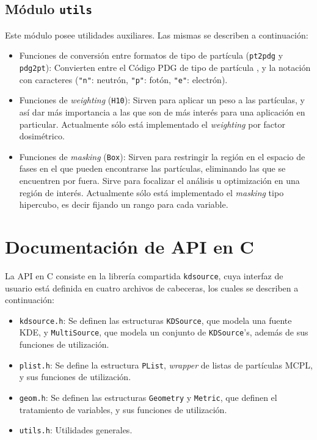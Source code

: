 \subsection{Módulo \texttt{utils}}

Este módulo posee utilidades auxiliares. Las mismas se describen a continuación:
\begin{itemize}
	\item Funciones de conversión entre formatos de tipo de partícula (\verb|pt2pdg| y \verb|pdg2pt|): Convierten entre el Código PDG de tipo de partícula \cite{PDG}, y la notación con caracteres (\verb|"n"|: neutrón, \verb|"p"|: fotón, \verb|"e"|: electrón).
	\item Funciones de \emph{weighting} (\verb|H10|): Sirven para aplicar un peso a las partículas, y así dar más importancia a las que son de más interés para una aplicación en particular. Actualmente sólo está implementado el \emph{weighting} por factor dosimétrico.
	\item Funciones de \emph{masking} (\verb|Box|): Sirven para restringir la región en el espacio de fases en el que pueden encontrarse las partículas, eliminando las que se encuentren por fuera. Sirve para focalizar el análisis u optimización en una región de interés. Actualmente sólo está implementado el \emph{masking} tipo hipercubo, es decir fijando un rango para cada variable.
\end{itemize}



\section{Documentación de API en C}
\label{ap:C}

La API en C consiste en la librería compartida \verb|kdsource|, cuya interfaz de usuario está definida en cuatro archivos de cabeceras, los cuales se describen a continuación:
\begin{itemize}
	\item \verb|kdsource.h|: Se definen las estructuras \verb|KDSource|, que modela una fuente KDE, y \verb|MultiSource|, que modela un conjunto de \verb|KDSource|'s, además de sus funciones de utilización.
	\item \verb|plist.h|: Se define la estructura \verb|PList|, \emph{wrapper} de listas de partículas MCPL, y sus funciones de utilización.
	\item \verb|geom.h|: Se definen las estructuras \verb|Geometry| y \verb|Metric|, que definen el tratamiento de variables, y sus funciones de utilización.
	\item \verb|utils.h|: Utilidades generales.
\end{itemize}

